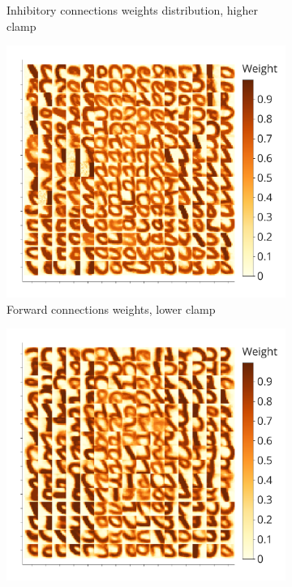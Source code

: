 \documentclass[a4paper,10pt]{article}
\begin{document}
\begin{figure}
\begin{subfigure}{0.45\textwidth}
    \caption{Inhibitory connections weights distribution, higher clamp}
\end{subfigure}
\begin{subfigure}{0.45\textwidth}
    \includegraphics[width=\textwidth,keepaspectratio=true]{weights_XY_clamp_low.pdf}
    \caption{Forward connections weights, lower clamp}
\end{subfigure} 
\begin{subfigure}{0.45\textwidth} 
    \includegraphics[width=\textwidth,keepaspectratio=true]{weights_XY_clamp_high.pdf}

\end{subfigure}
\end{figure}
\end{document}
